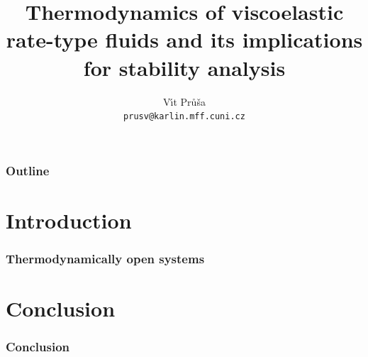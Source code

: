 \documentclass{beamer}
\title[Stability analysis]{Thermodynamics of viscoelastic rate-type fluids and its implications for stability analysis}
\author[V\'{\i}t Pr\r{u}\v{s}a] {V\'{\i}t Pr\r{u}\v{s}a \\ \texttt{prusv@karlin.mff.cuni.cz}}
\institute[Charles University]{Charles University, Czech Republic}
\newcommand{\smallbibentry}[1]{{\tiny \bibentry{#1}}}
\begin{document}
\begin{frame}
\titlepage

\end{frame}

\begin{frame}
  \frametitle{Outline}
  \tableofcontents
\end{frame}

\section{Introduction}
\label{sec:introduction}


\begin{frame}
  \frametitle{Thermodynamically open systems}

\end{frame}


\section{Conclusion}
\label{sec:conclusion}

\begin{frame}
  \frametitle{Conclusion}
\end{frame}
\end{document}
